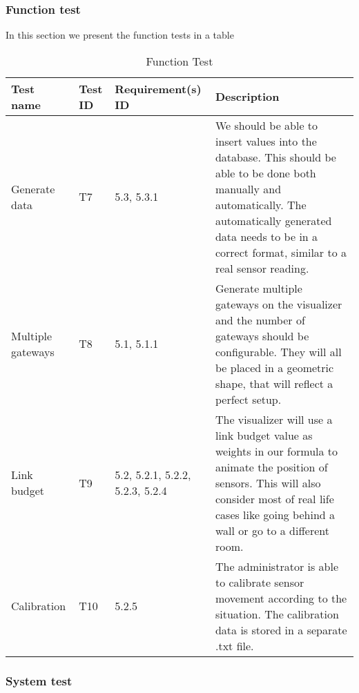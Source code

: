 \documentclass[../document]{subfiles}
\begin{document}
\subsubsection{Function test}

In this section we present the function tests in a table

\begin{table}[H]
\caption{Function Test}
\centering
\begin{tabularx}{\textwidth}{|L{2cm}|l|L{2.2cm}|X|}
	\hline
	Test name
	&Test ID
	&Requirement(s) ID
	&Description
	\\ \hline Generate data
	&T7
	&5.3, 5.3.1
	&We should be able to insert values into the database. This should be able to be done both manually and automatically. The automatically generated data needs to be in a correct format, similar to a real sensor reading.
	\\ \hline Multiple gateways
	&T8
	&5.1, 5.1.1
	&Generate multiple gateways on the visualizer and the number of gateways should be configurable. They will all be placed in a geometric shape, that will reflect a perfect setup.
	\\ \hline Link budget
	&T9
	&5.2, 5.2.1, 5.2.2, 5.2.3, 5.2.4
	&The visualizer will use a link budget value as weights in our formula to animate the position of sensors. This will also consider most of real life cases like going behind a wall or go to a different room.
	\\ \hline Calibration
	&T10
	&5.2.5
	&The administrator is able to calibrate sensor movement according to the situation. The calibration data is stored in a separate .txt file.
	\\ \hline 
\end{tabularx}
\end{table}

\subsubsection{System test}
\end{document}
